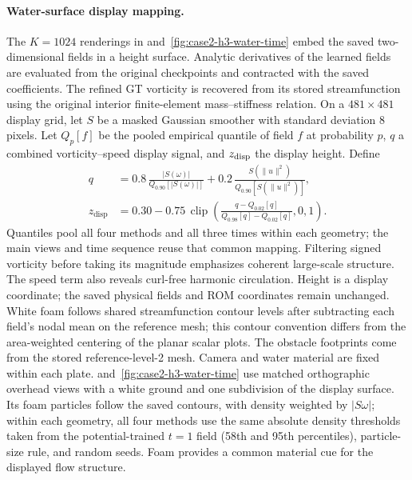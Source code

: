 \paragraph{Water-surface display mapping.}
The $K=1024$ renderings in  and~\ref{fig:case2-h3-water-time} embed the saved two-dimensional fields in a height surface. Analytic derivatives of the learned fields are evaluated from the original checkpoints and contracted with the saved coefficients. The refined GT vorticity is recovered from its stored streamfunction using the original interior finite-element mass--stiffness relation. On a $481\times481$ display grid, let $S$ be a masked Gaussian smoother with standard deviation 8 pixels. Let $Q_p[f]$ be the pooled empirical quantile of field $f$ at probability $p$, $q$ a combined vorticity--speed display signal, and $z_{\rm disp}$ the display height. Define
\begin{align*}
q&=0.8\,\frac{|S(\omega)|}{Q_{0.90}[|S(\omega)|]}
  +0.2\,\frac{S(\|u\|^2)}{Q_{0.90}[S(\|u\|^2)]},\\
z_{\mathrm{disp}}&=0.30-0.75\,\operatorname{clip}\!\left(
\frac{q-Q_{0.02}[q]}{Q_{0.98}[q]-Q_{0.02}[q]},0,1\right).
\end{align*}
Quantiles pool all four methods and all three times within each geometry; the main views and time sequence reuse that common mapping. Filtering signed vorticity before taking its magnitude emphasizes coherent large-scale structure. The speed term also reveals curl-free harmonic circulation. Height is a display coordinate; the saved physical fields and ROM coordinates remain unchanged. White foam follows shared streamfunction contour levels after subtracting each field's nodal mean on the reference mesh; this contour convention differs from the area-weighted centering of the planar scalar plots. The obstacle footprints come from the stored reference-level-2 mesh. Camera and water material are fixed within each plate.  and~\ref{fig:case2-h3-water-time} use matched orthographic overhead views with a white ground and one subdivision of the display surface. Its foam particles follow the saved contours, with density weighted by $|S\omega|$; within each geometry, all four methods use the same absolute density thresholds taken from the potential-trained $t=1$ field (58th and 95th percentiles), particle-size rule, and random seeds. Foam provides a common material cue for the displayed flow structure.
